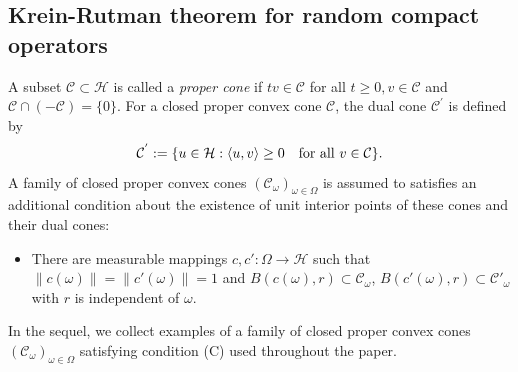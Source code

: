 \documentclass[pdflatex,sn-mathphys-num]{sn-jnl}%
\theoremstyle{thmstyleone}%
\theoremstyle{thmstyletwo}%
\theoremstyle{thmstylethree}%
\newcommand{\cH}{\mathcal{H}}
\newcommand{\cC}{\mathcal{C}}
\numberwithin{equation}{section}
\begin{document}
\subsection{Krein-Rutman theorem for random compact operators}\label{Subsection_3.1}
%
%
%
A subset $\mathcal C\subset \cH$ is called a \emph{proper cone} if $tv\in\mathcal C$ for all $t\geq 0, v\in\mathcal C$ and $\mathcal C\cap (-\mathcal C)=\{0\}$. For a closed proper convex cone $\mathcal C$, the dual cone $\mathcal C^{'}$ is defined by
\begin{equation}\label{Dualcone}
\mathcal C^{'}:=\{u\in\cH: \langle u,v\rangle\geq 0\quad\hbox{for all } v\in\mathcal C \}.
\end{equation}
A family of closed proper convex cones  $(\mathcal C_{\omega})_{\omega\in \Omega}$ is assumed to satisfies an additional condition about the existence of unit interior points of these cones and their dual cones:
\begin{itemize}
  \item [(C)] There are measurable mappings $c,c':\Omega\rightarrow \cH$ such that $\|c(\omega)\|=\|c'(\omega)\|=1$ and $B(c(\omega),r) \subset \mathcal C_{\omega}$, $B(c'(\omega),r) \subset \mathcal C'_{\omega}$
 with $r$ is independent of $\omega$.
\end{itemize}
%
%
In the sequel, we collect examples of a family of closed proper convex cones $(\cC_{\omega})_{\omega\in\Omega}$ satisfying condition (C) used throughout the paper.
%
%
\end{document}
